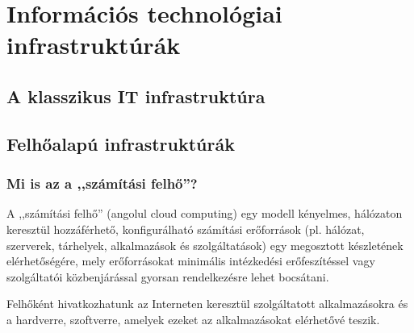 \chapter{Információs technológiai infrastruktúrák}
\section{A klasszikus IT infrastruktúra}
\section{Felhőalapú infrastruktúrák}
\subsection{Mi is az a ,,számítási felhő''?}

A ,,számítási felhő'' (angolul \foreignlanguage{english}{cloud computing}) egy modell kényelmes, hálózaton keresztül hozzáférhető, konfigurálható számítási erőforrások (pl. hálózat, szerverek, tárhelyek, alkalmazások és szolgáltatások) egy megosztott készletének elérhetőségére, mely erőforrásokat minimális intézkedési erőfeszítéssel vagy szolgáltatói közbenjárással gyorsan rendelkezésre lehet bocsátani.

Felhőként hivatkozhatunk az Interneten keresztül szolgáltatott alkalmazásokra és a hardverre, szoftverre, amelyek ezeket az alkalmazásokat elérhetővé teszik.


